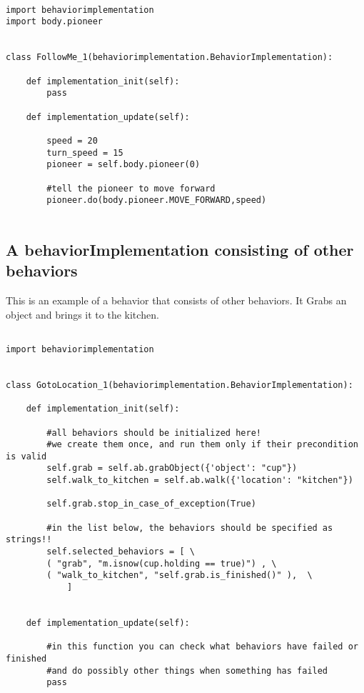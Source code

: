 \documentclass[a4paper, 10pt, oneside]{article}
\begin{document}
\lstset{ 
basicstyle=\footnotesize,  
}


\begin{lstlisting}

import behaviorimplementation
import body.pioneer


class FollowMe_1(behaviorimplementation.BehaviorImplementation):

    def implementation_init(self):
        pass

    def implementation_update(self):

        speed = 20
        turn_speed = 15
        pioneer = self.body.pioneer(0)
  
        #tell the pioneer to move forward
        pioneer.do(body.pioneer.MOVE_FORWARD,speed)


\end{lstlisting}




\subsection{A behaviorImplementation consisting of other behaviors}

This is an example of a behavior that consists of other behaviors. It Grabs an object and brings it to the kitchen.


\begin{lstlisting}

import behaviorimplementation


class GotoLocation_1(behaviorimplementation.BehaviorImplementation):

    def implementation_init(self):
        
        #all behaviors should be initialized here!
        #we create them once, and run them only if their precondition is valid
        self.grab = self.ab.grabObject({'object': "cup"})
        self.walk_to_kitchen = self.ab.walk({'location': "kitchen"})

        self.grab.stop_in_case_of_exception(True)

        #in the list below, the behaviors should be specified as strings!!
        self.selected_behaviors = [ \
        ( "grab", "m.isnow(cup.holding == true)") , \
        ( "walk_to_kitchen", "self.grab.is_finished()" ),  \
            ]
        

    def implementation_update(self):

        #in this function you can check what behaviors have failed or finished
        #and do possibly other things when something has failed
        pass

\end{lstlisting}
\end{document}

